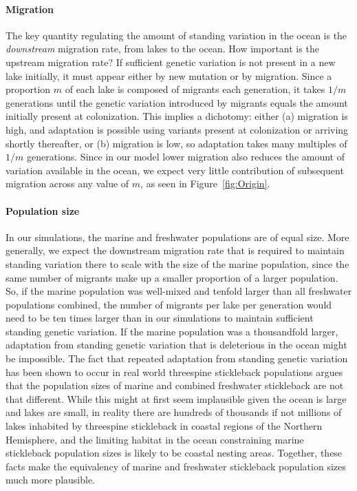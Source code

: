 \documentclass{article}
\begin{document}
\paragraph{Migration}
The key quantity regulating the amount of standing variation in the ocean is the \emph{downstream} migration rate, from lakes to the ocean. 
How important is the upstream migration rate?
If sufficient genetic variation is not present in a new lake initially, it must appear either by new mutation or by migration. 
Since a proportion $m$ of each lake is composed of migrants each generation, 
it takes $1/m$ generations until the genetic variation introduced by migrants equals the amount initially present at colonization. 
This implies a dichotomy: either 
(a) migration is high, and adaptation is possible using variants present at colonization or arriving shortly thereafter, or 
(b) migration is low, so adaptation takes many multiples of $1/m$ generations. 
Since in our model lower migration also reduces the amount of variation available in the ocean, 
we expect very little contribution of subsequent migration across any value of $m$, as seen in Figure~\ref{fig:Origin}.

\paragraph{Population size}
In our simulations,
the marine and freshwater populations are of equal size.
More generally, we expect the downstream migration rate that is required to maintain standing variation there
to scale with the size of the marine population,
since the same number of migrants make up a smaller proportion of a larger population.
So, if the marine population was well-mixed and tenfold larger than all freshwater populations combined,
the number of migrants per lake per generation would need to be ten times larger than in our simulations to maintain sufficient standing genetic variation.
If the marine population was a thousandfold larger,
adaptation from standing genetic variation that is deleterious in the ocean might be impossible. 
The fact that repeated adaptation from standing genetic variation has been shown to occur in real world threespine stickleback populations argues that the population sizes of marine and combined freshwater stickleback are not that different. 
While this might at first seem implausible given the ocean is large and lakes are small, in reality there are hundreds of thousands if not millions of lakes inhabited by threespine stickleback in coastal regions of the Northern Hemisphere, and the limiting habitat in the ocean constraining marine stickleback population sizes is likely to be coastal nesting areas. 
Together, these facts make the equivalency of marine and freshwater stickleback population sizes much more plausible.
\end{document}
